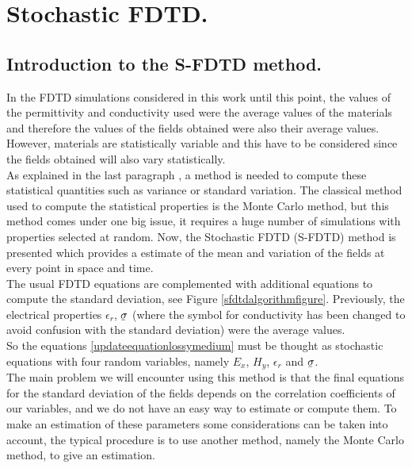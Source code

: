 \documentclass[12pt, oneside]{book}
\newcommand{\ubar}[1]{\underaccent{\bar}{#1}}
\begin{document}
\chapter{Stochastic FDTD.}
\section{Introduction to the S-FDTD method.}
In the FDTD simulations considered in this work until this point, the values of the permittivity and conductivity used were the average values of the materials and therefore the values of the fields obtained were also their average values. However, materials are statistically variable and this have to be considered since the fields obtained will also vary statistically. \\
\indent As explained in the last paragraph \cite{smith2011stochastic,smith2012stochastic,Garcia2019}, a method is needed to compute these statistical quantities such as variance or standard variation.
The classical method used to compute the statistical properties is the Monte Carlo method, but this method comes under one big issue, it requires a huge number of simulations with properties selected at random.
Now, the Stochastic FDTD (S-FDTD) method is presented which provides a estimate of the mean and variation of the fields at every point in space and time. \\
\indent The usual FDTD equations are complemented with additional equations to compute the standard deviation, see Figure \ref{sfdtdalgorithmfigure}. Previously, the electrical properties $\epsilon_r$, $\ubar{\sigma}$ (where the symbol for conductivity has been changed to avoid confusion with the standard deviation) were the average values. \\
So the equations \ref{updateequationlossymedium} must be thought as stochastic equations with four random variables, namely $E_x$, $H_y$, $\epsilon_r$ and $\ubar{\sigma}$. \\
\indent The main problem we will encounter using this method is that the final equations for the standard deviation of the fields depends on the correlation coefficients of our variables, and we do not have an easy way to estimate or compute them. To make an estimation of these parameters some considerations can be taken into account, the typical procedure is to use another method, namely the Monte Carlo method, to give an estimation.
\end{document}
